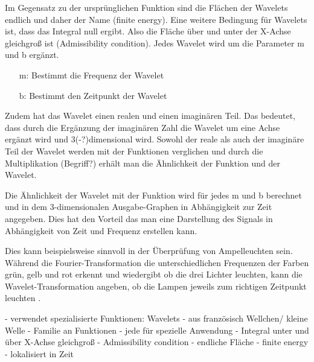 \par

Im Gegensatz zu der ursprünglichen Funktion sind die Flächen der Wavelets endlich und daher der Name (finite energy). Eine weitere Bedingung für Wavelets ist, dass das Integral null ergibt. Also die Fläche über und unter der X-Achse gleichgroß ist (Admissibility condition). Jedes Wavelet wird um die Parameter m und b ergänzt.

%
\begin{itemize}
    \item[m:] Bestimmt die Frequenz der Wavelet
    \item[b:] Bestimmt den Zeitpunkt der Wavelet
\end{itemize}
%

Zudem hat das Wavelet einen realen und einen imaginären Teil. Das bedeutet, dass durch die Ergänzung der imaginären Zahl die Wavelet um eine Achse ergänzt wird und 3(-?)dimensional wird. Sowohl der reale als auch der imaginäre Teil der Wavelet werden mit der Funktionen verglichen und durch die Multiplikation (Begriff?) erhält man die Ähnlichkeit der Funktion und der Wavelet.

\par

Die Ähnlichkeit der Wavelet mit der Funktion wird für jedes m und b berechnet und in dem 3-dimensionalen Ausgabe-Graphen in Abhängigkeit zur Zeit angegeben. Dies hat den Vorteil das man eine Darstellung des Signals in Abhängigkeit von Zeit und Frequenz erstellen kann.

\par

Dies kann beispielsweise sinnvoll in der Überprüfung von Ampelleuchten sein. Während die Fourier-Transformation die unterschiedlichen Frequenzen der Farben grün, gelb und rot erkennt und wiedergibt ob die drei Lichter leuchten, kann die Wavelet-Transformation angeben, ob die Lampen jeweils zum richtigen Zeitpunkt leuchten \parencite{wavelets}.

%
 - verwendet spezialisierte Funktionen: Wavelets
 - aus französisch Wellchen/ kleine Welle
 - Familie an Funktionen
   - jede für spezielle Anwendung
 - Integral unter und über X-Achse gleichgroß
   - Admissibility condition
 - endliche Fläche
   - finite energy
   - lokalisiert in Zeit